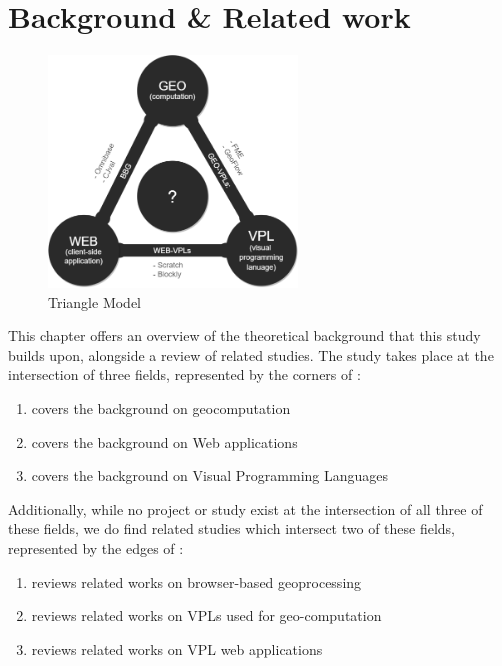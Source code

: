 
\chapter{Background \& Related work}
\label{chap:related}

\begin{figure}
  \centering
  \graphicspath{ {../../assets/diagrams/} }
  \includegraphics[width=250px]{geo-web-vpl.png}
  \caption{Triangle Model}
  \label{fig:triangle-model}
\end{figure}

This chapter offers an overview of the theoretical background that this study builds upon, alongside a review of related studies.
The study takes place at the intersection of three fields, represented by the corners of :
\begin{enumerate}[-]
  \item {} covers the background on geocomputation
  \item {} covers the background on Web applications
  \item {} covers the background on Visual Programming Languages
\end{enumerate}

Additionally, while no project or study exist at the intersection of all three of these fields, we do find related studies which intersect two of these fields, represented by the edges of :
\begin{enumerate}[-]
  \item {} reviews related works on browser-based geoprocessing
  \item {} reviews related works on VPLs used for geo-computation
  \item {} reviews related works on VPL web applications
\end{enumerate}

